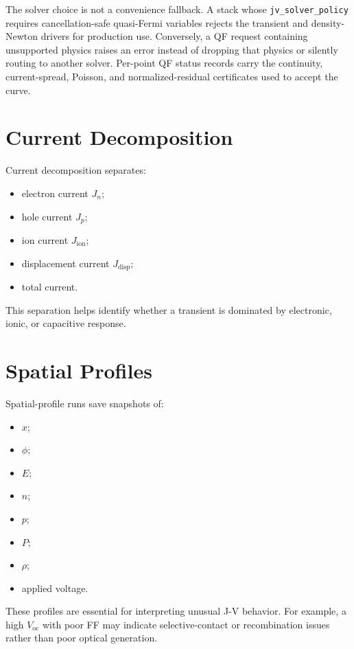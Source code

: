 \documentclass[
  11pt,
  american,
]{report}
\providecommand{\tightlist}{%
  \setlength{\itemsep}{0pt}\setlength{\parskip}{0pt}}
\begin{document}
The solver choice is not a convenience fallback. A stack whose
\texttt{jv\_solver\_policy} requires cancellation-safe quasi-Fermi
variables rejects the transient and density-Newton drivers for
production use. Conversely, a QF request containing unsupported physics
raises an error instead of dropping that physics or silently routing to
another solver. Per-point QF status records carry the continuity,
current-spread, Poisson, and normalized-residual certificates used to
accept the curve.

\hypertarget{current-decomposition}{%
\section{Current Decomposition}\label{current-decomposition}}

Current decomposition separates:

\begin{itemize}
\tightlist
\item
  electron current \(J_n\);
\item
  hole current \(J_p\);
\item
  ion current \(J_\mathrm{ion}\);
\item
  displacement current \(J_\mathrm{disp}\);
\item
  total current.
\end{itemize}

This separation helps identify whether a transient is dominated by
electronic, ionic, or capacitive response.

\hypertarget{spatial-profiles}{%
\section{Spatial Profiles}\label{spatial-profiles}}

Spatial-profile runs save snapshots of:

\begin{itemize}
\tightlist
\item
  \(x\);
\item
  \(\phi\);
\item
  \(E\);
\item
  \(n\);
\item
  \(p\);
\item
  \(P\);
\item
  \(\rho\);
\item
  applied voltage.
\end{itemize}

These profiles are essential for interpreting unusual J-V behavior. For
example, a high \(V_\mathrm{oc}\) with poor FF may indicate
selective-contact or recombination issues rather than poor optical
generation.
\end{document}
